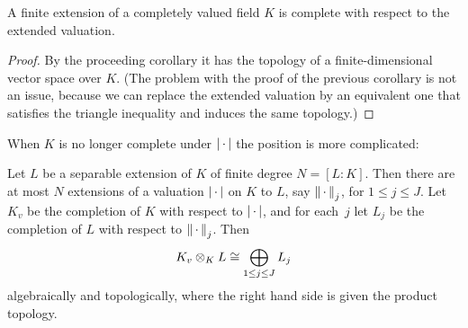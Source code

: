 \begin{corollary}\label{cor:iscomp}
A finite extension of a completely valued field $K$ is complete
with respect to the extended valuation.
\end{corollary}
\begin{proof}
By the proceeding corollary it has the topology of a finite-dimensional
vector space over $K$. (The problem with the proof of the previous
corollary is not an issue, because we can replace the extended valuation
by an equivalent one that satisfies the triangle inequality and
induces the same topology.)
\end{proof}

When $K$ is no longer complete under $\left|\,\cdot\,\right|$ the position is more complicated:
\begin{theorem}\label{thm:extensions}
Let $L$ be a separable extension of $K$ of finite degree
  $N=[L:K]$.  Then there are at most $N$ extensions of a valuation
  $\left|\,\cdot\,\right|$ on $K$ to $L$, say $\left\|\,\cdot\,\right\|_j$, for $1\leq j \leq J$.
  Let $K_v$ be the completion of $K$ with respect to $\left|\,\cdot\,\right|$, and for
  each~$j$ let $L_j$ be the completion of $L$ with respect to
  $\left\|\,\cdot\,\right\|_j$.  Then
\begin{equation}\label{eqn:tenslocal}
  K_v \otimes_K L \cong \bigoplus_{1\leq j\leq J} L_j
\end{equation}
algebraically and topologically, where the right hand side is given
the product topology.
\end{theorem}
